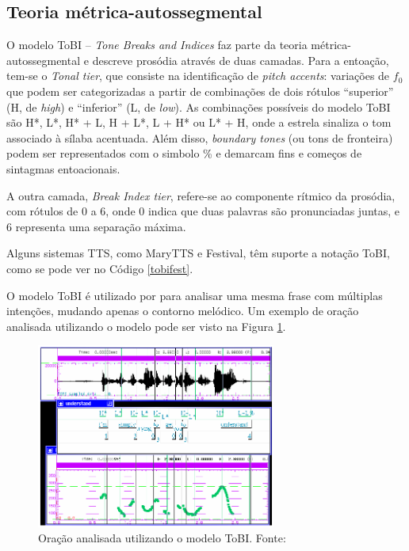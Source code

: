 \subsection{Teoria métrica-autossegmental}
O modelo ToBI -- \emph{Tone Breaks and Indices} \cite{tobi} faz parte da teoria
métrica-autossegmental e descreve prosódia através de duas camadas. Para a
entoação, tem-se o \emph{Tonal tier}, que consiste na identificação de
\emph{pitch accents}: variações de $ f_0 $ que podem ser categorizadas a partir de
combinações de dois rótulos ``superior'' (H, de \emph{high}) e ``inferior'' (L,
de \emph{low}). As combinações possíveis do modelo ToBI são H*, L*, H* + L, H +
L*, L + H* ou L* + H, onde a estrela sinaliza o tom associado à sílaba
acentuada. Além disso, \emph{boundary tones} (ou tons de fronteira) podem ser
representados com o simbolo \% e demarcam fins e começos de sintagmas
entoacionais.

A outra camada, \emph{Break Index tier}, refere-se ao componente rítmico da
prosódia, com rótulos de 0 a 6, onde 0 indica que duas palavras são
pronunciadas juntas, e 6 representa uma separação máxima.

Alguns sistemas TTS, como MaryTTS e Festival, têm suporte a notação ToBI, como se
pode ver no Código \ref{tobifest}.

O modelo ToBI é utilizado por  para analisar uma mesma
frase com múltiplas intenções, mudando apenas o contorno melódico. Um exemplo de
oração analisada utilizando o modelo pode ser visto na Figura \ref{fig:tobiana}.

\begin{figure}
  \centering
    \includegraphics[width=0.7\textwidth]{Imagens/tobi.png}
  \caption[Oração analisada utilizando o modelo ToBI]{Oração analisada utilizando o modelo ToBI. Fonte: \cite{tobiguide}}
  \label{fig:tobiana}
\end{figure}


